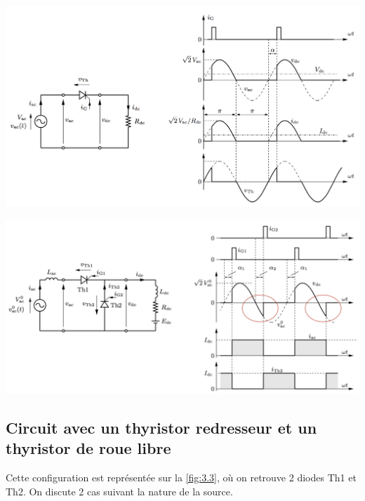 			\begin{minipage}{0.46\textwidth}
				\includegraphics[scale=0.22]{ch3/2}
				\label{fig:3.2}
			\end{minipage}
			\begin{minipage}{0.46\textwidth}
				\includegraphics[scale=0.22]{ch3/3}
				\label{fig:3.3}
			\end{minipage}
			
		\subsection{Circuit avec un thyristor redresseur et un thyristor de roue libre}
			Cette configuration est représentée sur la \autoref{fig:3.3}, où on retrouve 2 diodes Th1 et Th2. On discute 2 cas suivant la nature de la source.  
			
